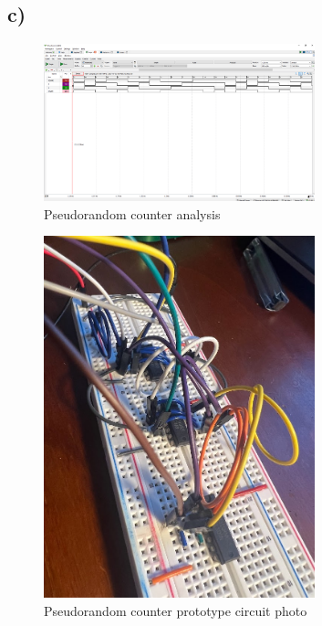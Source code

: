 \documentclass{article}
\begin{document}
	\subsection*{c)}
	
	\begin{figure}[H]
	    \centering
	    \includegraphics[width=0.7\textwidth]{2c-wfm}
	    \caption{Pseudorandom counter analysis}
	\end{figure}
	
	\begin{figure}[H]
	    \centering
	    \includegraphics[width=0.7\textwidth]{2c-photo}
	    \caption{Pseudorandom counter prototype circuit photo}
	\end{figure}
		
\end{document}
